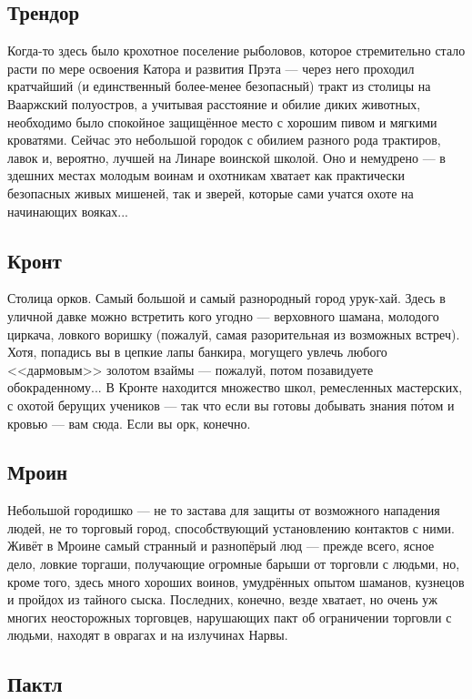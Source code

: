 \documentclass[12pt,a4paper]{book}
\begin{document}
\subsection{Трендор}

Когда-то здесь было крохотное поселение рыболовов, которое стремительно стало расти по мере освоения Катора и развития Прэта --- через него проходил кратчайший (и единственный более-менее безопасный) тракт из столицы на Вааржский полуостров, а учитывая расстояние и обилие диких животных, необходимо было спокойное защищённое место с хорошим пивом и мягкими кроватями. Сейчас это небольшой городок с обилием разного рода трактиров, лавок и, вероятно, лучшей на Линаре воинской школой. Оно и немудрено --- в здешних местах молодым воинам и охотникам хватает как практически безопасных живых мишеней, так и зверей, которые сами учатся охоте на начинающих вояках...

\subsection{Кронт}

Столица орков. Самый большой и самый разнородный город урук-хай. Здесь в уличной давке можно встретить кого угодно --- верховного шамана, молодого циркача, ловкого воришку (пожалуй, самая разорительная из возможных встреч). Хотя, попадись вы в цепкие лапы банкира, могущего увлечь любого <<дармовым>> золотом взаймы --- пожалуй, потом позавидуете обокраденному... В Кронте находится множество школ, ремесленных мастерских, с охотой берущих учеников --- так что если вы готовы добывать знания п\'{о}том и кровью --- вам сюда. Если вы орк, конечно.

\subsection{Мроин}

Небольшой городишко --- не то застава для защиты от возможного нападения людей, не то торговый город, способствующий установлению контактов с ними. Живёт в Мроине самый странный и разнопёрый люд --- прежде всего, ясное дело, ловкие торгаши, получающие огромные барыши от торговли с людьми, но, кроме того, здесь много хороших воинов, умудрённых опытом шаманов, кузнецов и пройдох из тайного сыска. Последних, конечно, везде хватает, но очень уж многих неосторожных торговцев, нарушающих пакт об ограничении торговли с людьми, находят в оврагах и на излучинах Нарвы.

\subsection{Пактл}
\end{document}
